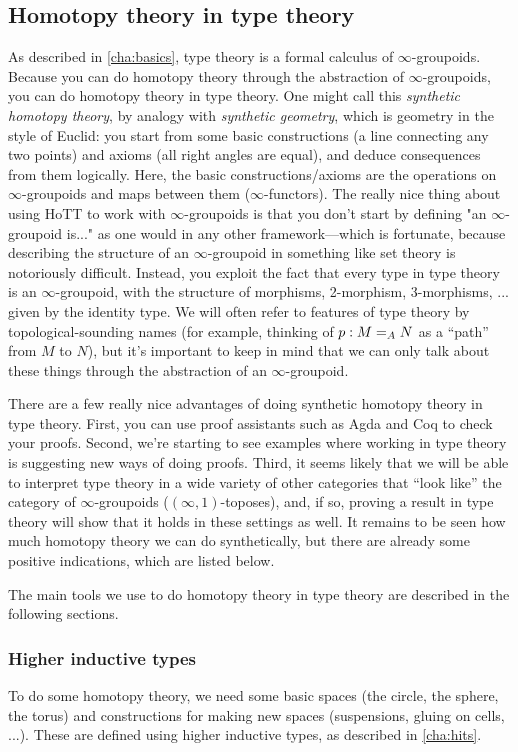 \subsection{Homotopy theory in type theory}

As described in \autoref{cha:basics}, type theory is a formal calculus of $\infty$-groupoids. Because you can
do homotopy theory through the abstraction of $\infty$-groupoids, you
can do homotopy theory in type theory.  One might call this
\emph{synthetic homotopy theory}, by analogy with \emph{synthetic
  geometry}, which is geometry in the style of Euclid: you start from
some basic constructions (a line connecting any two points) and axioms
(all right angles are equal), and deduce consequences from them
logically.  Here, the basic constructions/axioms are the operations on
$\infty$-groupoids and maps between them ($\infty$-functors).  The
really nice thing about using HoTT to work with $\infty$-groupoids is
that you don't start by defining "an $\infty$-groupoid is..." as one
would in any other framework---which is fortunate, because describing
the structure of an $\infty$-groupoid in something like set theory is
notoriously difficult.  Instead, you exploit the fact that every type in
type theory is an $\infty$-groupoid, with the structure of morphisms,
2-morphism, 3-morphisms, ... given by the identity type.  We will often
refer to features of type theory by topological-sounding names (for
example, thinking of $p : \id[A] M N$ as a ``path'' from $M$ to $N$),
but it's important to keep in mind that we can only talk about these
things through the abstraction of an $\infty$-groupoid.

There are a few really nice advantages of doing synthetic homotopy theory
in type theory.  First, you can use proof assistants such as Agda and Coq
to check your proofs.  Second, we're starting to see examples where
working in type theory is suggesting new ways of doing proofs.  Third,
it seems likely that we will be able to interpret type theory in a wide
variety of other categories that ``look like'' the category of
$\infty$-groupoids ($(\infty,1)$-toposes), and, if so, proving a result
in type theory will show that it holds in these settings as well. It
remains to be seen how much homotopy theory we can do synthetically, but
there are already some positive indications, which are listed below.

The main tools we use to do homotopy theory in type theory are described in the
following sections.

\subsubsection{Higher inductive types} To do some homotopy theory, we need some
  basic spaces (the circle, the sphere, the torus) and constructions for
  making new spaces (suspensions, gluing on cells, ...).  These are
  defined using higher inductive types, as described in
  \autoref{cha:hits}.

